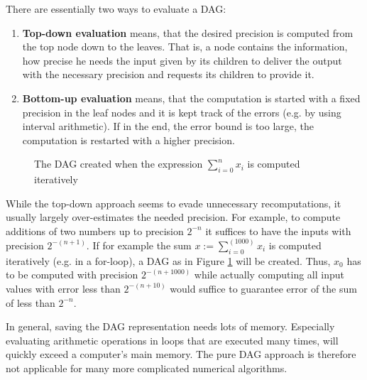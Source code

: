 		There are essentially two ways to evaluate a DAG:
		\begin{enumerate}
			\item \textbf{Top-down evaluation} means, that the desired precision is computed from the top node down to the leaves.
			That is, a node contains the information, how precise he needs the input given by its children to deliver the output with the necessary precision and requests its children to provide it.  
			\item \textbf{Bottom-up evaluation} means, that the computation is started with a fixed precision in the leaf nodes 
			and it is kept track of the errors (e.g. by using interval arithmetic). 
			If in the end, the error bound is too large, the computation is restarted with a higher precision. 
		\end{enumerate}
    \begin{figure}
      \centering
\caption{The DAG created when the expression $\sum_{i=0}^n x_i$ is computed
iteratively}\label{fig:sum dag}
\end{figure}
		While the top-down approach seems to evade unnecessary recomputations, it
    usually largely over-estimates the needed precision.
    For example, to compute additions of two numbers up to precision $2^{-n}$
    it suffices to have the inputs with precision $2^{-(n+1)}$.
    If for example the sum $x := \sum_{i=0}^(1000) x_i$ is computed iteratively (e.g. in a
    for-loop), a DAG as in Figure \ref{fig:sum dag} will be created. 
    Thus, $x_0$ has to be computed with precision $2^{-(n+1000)}$ while actually
    computing all input values with error less than $2^{-(n+10)}$ would 
    suffice to guarantee error of the sum of less than $2^{-n}$.

    In general, saving the DAG representation needs lots of memory. 
    Especially evaluating arithmetic operations in loops that are executed many
    times, will quickly exceed a computer's main memory.
    The pure DAG approach is therefore not applicable for many more complicated
    numerical algorithms.
